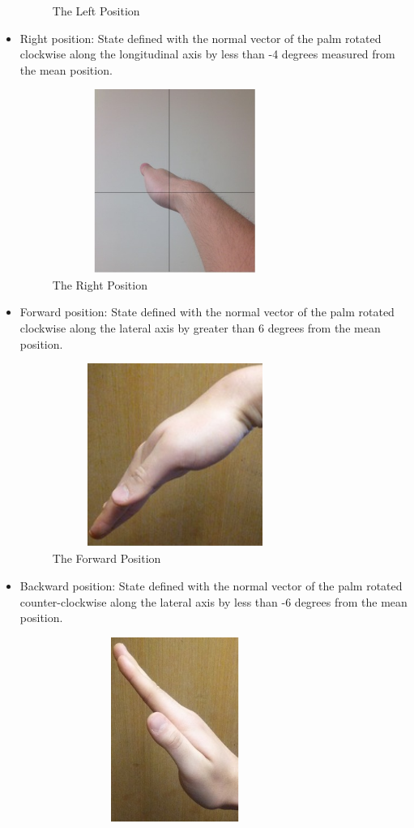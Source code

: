 \documentclass[letterpaper,english, 12pt]{article}
\begin{document}
\begin{itemize}
\begin{figure}[t]
			\caption{The Left Position}
		\end{figure}
		\item Right position: State defined with the normal vector of the palm rotated clockwise along the longitudinal axis by less than -4 degrees measured from the mean position. 
		\begin{figure}[t]
			\centering
			\includegraphics[height=6cm, width=80mm]{pics/right.jpg} 
			\caption{The Right Position}
		\end{figure}
		\item Forward position: State defined with the normal vector of the palm rotated clockwise along the lateral axis by greater than 6 degrees from the mean position. 
		\begin{figure}[t]
	 		\centering
			\includegraphics[height=6cm, width=80mm]{pics/forward.jpg} 
			\caption{The Forward Position}
		\end{figure}
		\item Backward position: State defined with the normal vector of the palm rotated counter-clockwise along the lateral axis by less than -6 degrees from the mean position.  
		\begin{figure}[t]
	 		\centering
			\includegraphics[height=6cm, width=80mm]{pics/backward.jpg} 

\end{figure}
\end{itemize}
\end{document}

